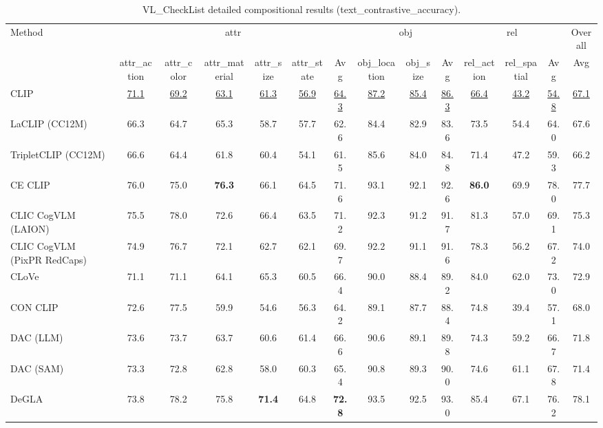 \begin{table}[t]
  \centering
  \scriptsize
  \caption{VL_CheckList detailed compositional results (text_contrastive_accuracy).}
  \label{tab:VL_CheckList_detailed}
  \begin{adjustbox}{max width=\textwidth}
  \setlength{\tabcolsep}{2pt}
  \begin{tabular}{p{5cm}cccccc|ccc|ccc|c}
    \toprule
    Method & \multicolumn{6}{c}{attr} & \multicolumn{3}{c}{obj} & \multicolumn{3}{c}{rel} & Overall \\
     & attr\_action & attr\_color & attr\_material & attr\_size & attr\_state & Avg & obj\_location & obj\_size & Avg & rel\_action & rel\_spatial & Avg & Avg \\
    \midrule
    CLIP & \underline{71.1} & \underline{69.2} & \underline{63.1} & \underline{61.3} & \underline{56.9} & \underline{64.3} & \underline{87.2} & \underline{85.4} & \underline{86.3} & \underline{66.4} & \underline{43.2} & \underline{54.8} & \underline{67.1} \\
    \midrule
    LaCLIP (CC12M) & 66.3 & 64.7 & 65.3 & 58.7 & 57.7 & 62.6 & 84.4 & 82.9 & 83.6 & 73.5 & 54.4 & 64.0 & 67.6 \\
    TripletCLIP (CC12M) & 66.6 & 64.4 & 61.8 & 60.4 & 54.1 & 61.5 & 85.6 & 84.0 & 84.8 & 71.4 & 47.2 & 59.3 & 66.2 \\
    \midrule
    CE CLIP & 76.0 & 75.0 & \textbf{76.3} & 66.1 & 64.5 & 71.6 & 93.1 & 92.1 & 92.6 & \textbf{86.0} & 69.9 & 78.0 & 77.7 \\
    CLIC CogVLM (LAION) & 75.5 & 78.0 & 72.6 & 66.4 & 63.5 & 71.2 & 92.3 & 91.2 & 91.7 & 81.3 & 57.0 & 69.1 & 75.3 \\
    CLIC CogVLM (PixPR RedCaps) & 74.9 & 76.7 & 72.1 & 62.7 & 62.1 & 69.7 & 92.2 & 91.1 & 91.6 & 78.3 & 56.2 & 67.2 & 74.0 \\
    CLoVe & 71.1 & 71.1 & 64.1 & 65.3 & 60.5 & 66.4 & 90.0 & 88.4 & 89.2 & 84.0 & 62.0 & 73.0 & 72.9 \\
    CON CLIP & 72.6 & 77.5 & 59.9 & 54.6 & 56.3 & 64.2 & 89.1 & 87.7 & 88.4 & 74.8 & 39.4 & 57.1 & 68.0 \\
    DAC (LLM) & 73.6 & 73.7 & 63.7 & 60.6 & 61.4 & 66.6 & 90.6 & 89.1 & 89.8 & 74.3 & 59.2 & 66.7 & 71.8 \\
    DAC (SAM) & 73.3 & 72.8 & 62.8 & 58.0 & 60.3 & 65.4 & 90.8 & 89.3 & 90.0 & 74.6 & 61.1 & 67.8 & 71.4 \\
    DeGLA & 73.8 & 78.2 & 75.8 & \textbf{71.4} & 64.8 & \textbf{72.8} & 93.5 & 92.5 & 93.0 & 85.4 & 67.1 & 76.2 & 78.1 \\

\end{tabular}
\end{adjustbox}
\end{table}
